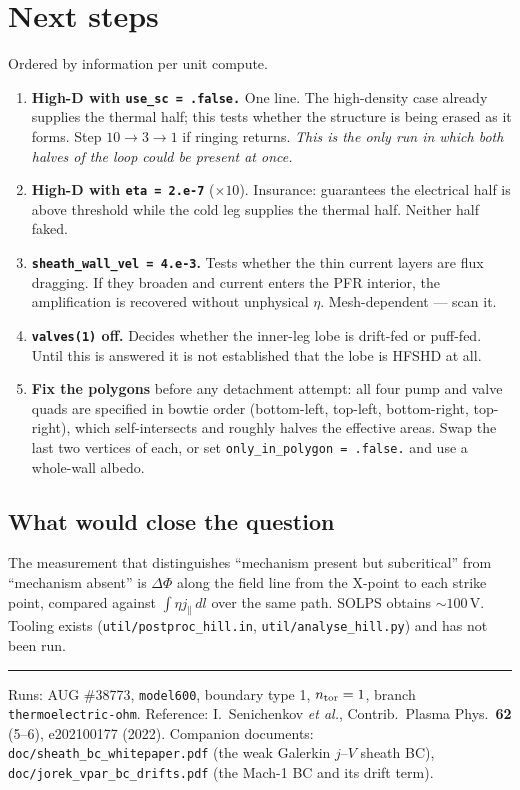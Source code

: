 \documentclass[11pt,a4paper]{article}
\newcommand{\code}[1]{\texttt{\small #1}}
\newcommand{\jpar}{j_\parallel}
\begin{document}
\section{Next steps}

Ordered by information per unit compute.

\begin{enumerate}\itemsep3pt
\item \textbf{High-D with \code{use\_sc = .false.}} One line. The high-density case already
      supplies the thermal half; this tests whether the structure is being erased as it forms.
      Step $10\to3\to1$ if ringing returns. \emph{This is the only run in which both halves of
      the loop could be present at once.}
\item \textbf{High-D with \code{eta = 2.e-7}} ($\times10$). Insurance: guarantees the electrical
      half is above threshold while the cold leg supplies the thermal half. Neither half faked.
\item \textbf{\code{sheath\_wall\_vel = 4.e-3}.} Tests whether the thin current layers are flux
      dragging. If they broaden and current enters the PFR interior, the amplification is
      recovered without unphysical $\eta$. Mesh-dependent --- scan it.
\item \textbf{\code{valves(1)} off.} Decides whether the inner-leg lobe is drift-fed or
      puff-fed. Until this is answered it is not established that the lobe is HFSHD at all.
\item \textbf{Fix the polygons} before any detachment attempt: all four pump and valve quads
      are specified in bowtie order (bottom-left, top-left, bottom-right, top-right), which
      self-intersects and roughly halves the effective areas. Swap the last two vertices of
      each, or set \code{only\_in\_polygon = .false.} and use a whole-wall albedo.
\end{enumerate}

\subsection*{What would close the question}

The measurement that distinguishes ``mechanism present but subcritical'' from ``mechanism
absent'' is $\Delta\Phi$ along the field line from the X-point to each strike point, compared
against $\int\!\eta\jpar\,dl$ over the same path. SOLPS obtains $\sim100$\,V. Tooling exists
(\code{util/postproc\_hill.in}, \code{util/analyse\_hill.py}) and has not been run.

\vspace{1em}
\hrule
\vspace{0.6em}
\noindent\footnotesize
Runs: AUG \#38773, \code{model600}, boundary type 1, $n_{\rm tor}=1$, branch
\code{thermoelectric-ohm}. Reference: I.~Senichenkov \emph{et al.}, Contrib.\ Plasma Phys.\
\textbf{62} (5--6), e202100177 (2022). Companion documents:
\code{doc/sheath\_bc\_whitepaper.pdf} (the weak Galerkin $j$--$V$ sheath BC),
\code{doc/jorek\_vpar\_bc\_drifts.pdf} (the Mach-1 BC and its drift term).
\end{document}
